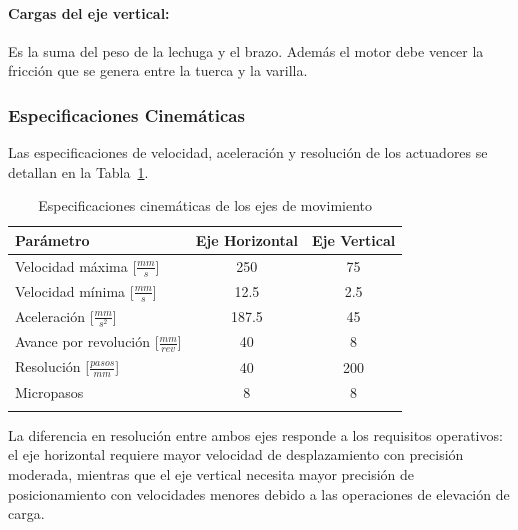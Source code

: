 \paragraph{Cargas del eje vertical:}
Es la suma del peso de la lechuga y el brazo. Además el motor debe vencer la fricción que se genera entre la tuerca y la varilla.

\subsubsection{Especificaciones Cinemáticas}

Las especificaciones de velocidad, aceleración y resolución de los actuadores se detallan en la Tabla~\ref{tab:especificaciones_cinematicas}.

\begin{table}[htbp]
\centering
\caption{Especificaciones cinemáticas de los ejes de movimiento}
\label{tab:especificaciones_cinematicas}
\begin{tabular}{|l|c|c|}
\hline
\textbf{Parámetro} & \textbf{Eje Horizontal} & \textbf{Eje Vertical} \\ \hline
Velocidad máxima [\(\frac{mm}{s}\)] & 250 & 75 \\ \hline
Velocidad mínima [\(\frac{mm}{s}\)] & 12.5 & 2.5 \\ \hline
Aceleración [\(\frac{mm}{s^2}\)] & 187.5 & 45 \\ \hline
Avance por revolución [\(\frac{mm}{rev}\)] & 40 & 8 \\ \hline
Resolución [\(\frac{pasos}{mm}\)] & 40 & 200 \\ \hline
Micropasos & 8 & 8 \\ \hline
\multicolumn{3}{c}{} \\
\end{tabular}
\end{table}

La diferencia en resolución entre ambos ejes responde a los requisitos operativos: el eje horizontal requiere mayor velocidad de desplazamiento con precisión moderada, mientras que el eje vertical necesita mayor precisión de posicionamiento con velocidades menores debido a las operaciones de elevación de carga.